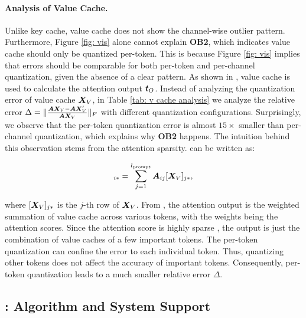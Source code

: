 \paragraph{Analysis of Value Cache.}
Unlike key cache, value cache does not show the channel-wise outlier pattern. Furthermore, Figure \ref{fig: vis} alone cannot explain \textbf{OB2}, which indicates value cache should only be quantized per-token. 
This is because Figure \ref{fig: vis} implies that errors should be comparable for both per-token and per-channel quantization, given the absence of a clear pattern.
As shown in , value cache is used to calculate the attention output ${\bm{t}}_O$.
Instead of analyzing the quantization error of value cache ${\bm{X}}_V$, in Table \ref{tab: v cache analysis} we analyze the relative error $\Delta=\|\frac{{\bm{A}}{\bm{X}}_V-{\bm{A}} {\bm{X}}'_V}{{\bm{A}}{\bm{X}}_V}\|_F$ with different quantization configurations.
Surprisingly, we observe that the per-token quantization error is almost $15\times$ smaller than per-channel quantization, which explains why \textbf{OB2} happens.
The intuition behind this observation stems from the attention sparsity.
 can be written as:

\vspace{-2em}
\begin{align}
    [\mA \mX_V]_{i*} = \sum_{j=1}^{l_{\text{prompt}}} \mA_{ij} [\mX_{V}]_{j*},
    \label{eq: att}
\end{align}
\vspace{-2em}

where $[{\bm{X}}_{V}]_{j*}$ is the $j$-th row of ${\bm{X}}_{V}$.
From , the attention output is the weighted summation of value cache across various tokens, with the weights being the attention scores.
Since the attention score is highly sparse \citep{tian2023scan}, the output is just the combination of value caches of a few important tokens.
The per-token quantization can confine the error to each individual token.
Thus, quantizing other tokens does not affect the accuracy of important tokens. Consequently, per-token quantization leads to a much smaller relative error $\Delta$. 

\subsection{\kivi{}: Algorithm and System Support}
\label{sec: algo}

